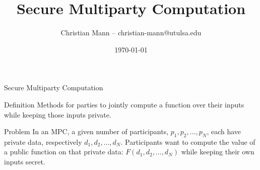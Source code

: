\documentclass[12pt]{beamer}
\title[Introduction to Cryptography]{Secure Multiparty Computation}
\author{Christian Mann -- christian-mann@utulsa.edu}
\institute{University of Tulsa\\
Tulsa, Oklahoma 74104}
\date{\today}
\begin{document}
\lstset{
language=python,                %
showspaces=false,               %
showstringspaces=false,         %
showtabs=false,                 %
tabsize=4,	                %
}

\newtheorem{mydef}{Definition}


\begin{frame}
\titlepage
\end{frame}

\begin{frame}{Secure Multiparty Computation}
	\begin{block}{Definition}
		Methods for parties to jointly compute a function over their inputs
		while keeping those inputs private.
	\end{block}

	\begin{block}{Problem}
		In an MPC, a given number of participants, $p_1, p_2, ..., p_N$, each have
		private data, respectively $d_1, d_2, ..., d_N$. Participants want to compute
		the value of a public function on that private data: $F(d_1, d_2, ...,
		d_N)$
		while keeping their own inputs secret.
	\end{block}
\end{frame}
\end{document}
